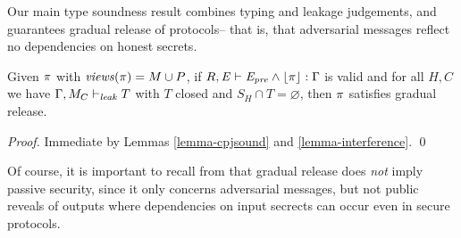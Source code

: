 Our main type soundness result combines typing and leakage judgements,
and guarantees gradual release of protocols-- that is, that adversarial
messages reflect no dependencies on honest secrets.
\begin{theorem}
  \label{theorem-cpj}
  Given $\pi$ with $\mathit{views}(\pi) = M \cup P$, if $R,\mathit{E} \vdash \mathit{E}_{\mathit{pre}} \wedge \lfloor \pi \rfloor : \Gamma$
  is valid and for all $H,C$ we have $\Gamma,M_C \vdash_{\mathit{leak}} T$ with $T$ closed
  and $S_H \cap T = \varnothing$, then $\pi$ satisfies gradual release.
\end{theorem}
\begin{proof}
  Immediate by Lemmas \ref{lemma-cpjsound} and \ref{lemma-interference}. \qed
\end{proof}

\leakjfig

Of course, it is important to recall from \cite{skalka-near-ppdp24}
that gradual release does \emph{not} imply passive security, since it
only concerns adversarial messages, but not public reveals of outputs
where dependencies on input secrects can occur even in secure
protocols.

\begin{comment}
\subsection{Examples}

\begin{verbatimtab}
m[s1]@2 := (s[1] - r[local] - r[x])@1
m[s1]@3 := r[x]@1

// m[s1]@2 : { c(r[x]@1, { c(r[local]@1, {s[1]@1} ) }
// m[s1]@3 : { r[x]@1 }
\end{verbatimtab}

\begin{verbatimtab}
m[x]@1 := s2(s[x],-r[x],r[x])@2

// m[x]@1 == s[x]@2 + -r[x]@2 
// m[x]@1 : { c(r[x]@2, { s[x]@2 }) } 

m[y]@1 := OT(s[y]@1,-r[y],r[y])@2

// m[y]@1 == s[y]@1 + -r[y]@2
// m[y]@1 : { c(r[y]@2, { s[y]@1 }) } 
\end{verbatimtab}
\end{comment}
